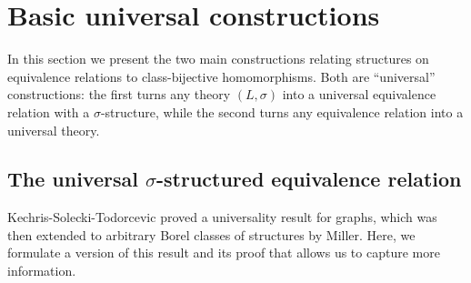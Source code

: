 \documentclass[11pt]{article}
\begin{document}
\section{Basic universal constructions}
\label{sec:univcons}

In this section we present the two main constructions relating structures on equivalence relations to class-bijective homomorphisms.  Both are ``universal'' constructions: the first turns any theory $(L, \sigma)$ into a universal equivalence relation with a $\sigma$-structure, while the second turns any equivalence relation into a universal theory.

\subsection{The universal $\sigma$-structured equivalence relation}
\label{sec:esigma}

Kechris-Solecki-Todorcevic \cite[7.1]{KST} proved a universality result for graphs, which was then extended to arbitrary Borel classes of structures by Miller.  Here, we formulate a version of this result and its proof that allows us to capture more information.
\end{document}
